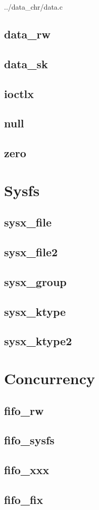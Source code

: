 \documentclass{article}
\begin{document}

	{../data_chr/data.c}


%


\subsection{data\_rw}
\subsection{data\_sk}
\subsection{ioctlx}
\subsection{null}
\subsection{zero}

\section{Sysfs}
\subsection{sysx\_file}
\subsection{sysx\_file2}
\subsection{sysx\_group}
\subsection{sysx\_ktype}
\subsection{sysx\_ktype2}

\section{Concurrency}
\subsection{fifo\_rw}
\subsection{fifo\_sysfs}
\subsection{fifo\_xxx}
\subsection{fifo\_fix}

\pagebreak
\printbibliography

\end{document}
